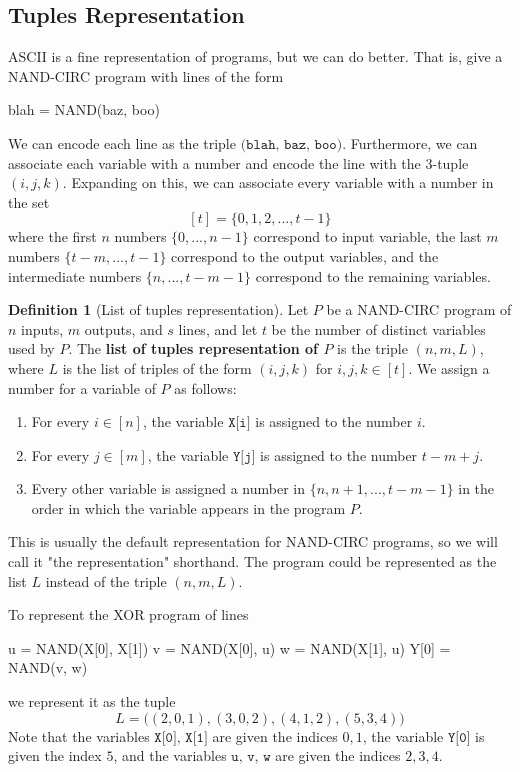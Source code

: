 \documentclass[a4paper, 12pt]{report}
\theoremstyle{remark}
\theoremstyle{definition}
\newtheorem{definition}{Definition}[section]
\begin{document}
\subsection{Tuples Representation}
ASCII is a fine representation of programs, but we can do better. That is, give a NAND-CIRC program with lines of the form 
\begin{python}
blah = NAND(baz, boo)
\end{python}
We can encode each line as the triple $\texttt{(blah, baz, boo)}$. Furthermore, we can associate each variable with a number and encode the line with the 3-tuple $(i, j, k)$. Expanding on this, we can associate every variable with a number in the set
\[[t] = \{0, 1, 2, ..., t-1\}\]
where the first $n$ numbers $\{0, ..., n-1\}$ correspond to input variable, the last $m$ numbers $\{t-m, ..., t-1\}$ correspond to the output variables, and the intermediate numbers $\{n, ..., t-m-1\}$ correspond to the remaining variables. 

\begin{definition}[List of tuples representation]
Let $P$ be a NAND-CIRC program of $n$ inputs, $m$ outputs, and $s$ lines, and let $t$ be the number of distinct variables used by $P$. The \textbf{list of tuples representation of $P$} is the triple $(n, m, L)$, where $L$ is the list of triples of the form $(i, j, k)$ for $i, j, k \in [t]$. We assign a number for a variable of $P$ as follows:
\begin{enumerate}
    \item For every $i \in [n]$, the variable $\texttt{X[i]}$ is assigned to the number $i$. 
    \item For every $j \in [m]$, the variable $\texttt{Y[j]}$ is assigned to the number $t - m + j$.
    \item Every other variable is assigned a number in $\{n, n+1, ..., t-m-1\}$ in the order in which the variable appears in the program $P$. 
\end{enumerate}
This is usually the default representation for NAND-CIRC programs, so we will call it "the representation" shorthand. The program could be represented as the list $L$ instead of the triple $(n, m, L)$. 
\end{definition}

\begin{example}
To represent the XOR program of lines 
\begin{python}
u = NAND(X[0], X[1])
v = NAND(X[0], u) 
w = NAND(X[1], u)
Y[0] = NAND(v, w)
\end{python}
we represent it as the tuple 
\[L = \big( (2, 0, 1), (3, 0, 2), (4, 1, 2), (5, 3, 4)\big) \]
Note that the variables $\texttt{X[0], X[1]}$ are given the indices $0, 1$, the variable $\texttt{Y[0]}$ is given the index $5$, and the variables $\texttt{u, v, w}$ are given the indices $2, 3, 4$. 
\end{example}
\end{document}

